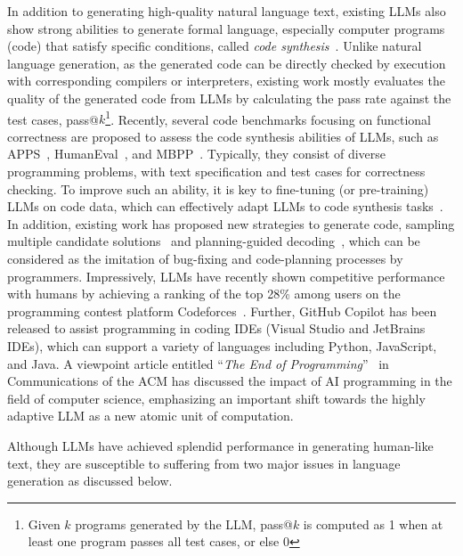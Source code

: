 In addition to generating high-quality natural language text, existing LLMs also show strong abilities to generate {formal language, especially  computer programs (\ie code)} that satisfy specific conditions, called \emph{code synthesis}~\cite{Gulwani-Found-2017-Program}. 
Unlike natural language generation, as the generated code can be directly checked by execution with corresponding compilers or interpreters, existing work mostly evaluates the quality of the generated code from LLMs by calculating the pass rate against the test cases, \ie pass@$k$\footnote{Given $k$ programs generated by the LLM, pass@$k$ is computed as 1 when at least one program passes all test cases, or else 0}. %
Recently, several code benchmarks focusing on functional correctness are proposed to assess the code synthesis abilities of LLMs, such as APPS~\cite{Hendrycks-nips-2021-Measuring}, HumanEval~\cite{Chen-arxiv-2021-evaluating}, and MBPP~\cite{Austin-arxiv-2021-Program}. 
Typically, they consist of diverse programming problems, with text specification and test cases for correctness checking. 
To improve such an ability, it is key to fine-tuning (or pre-training) LLMs on code data, which can effectively adapt LLMs to code synthesis tasks~\cite{nijkamp-arxiv-2022-Codegen}.
{In addition, existing work  has proposed new strategies to generate code, \eg sampling multiple candidate solutions~\cite{Austin-arxiv-2021-Program} and planning-guided decoding~\cite{Zhang-ICLR-2023-Planning}, which can be considered as the imitation of bug-fixing and code-planning processes by  programmers.}
Impressively,  LLMs have recently shown competitive performance with humans by achieving a ranking of the top 28\% among users on the programming contest platform Codeforces~\cite{Li-Science-2022-AlphaCode}. 
Further, GitHub Copilot has been released to assist programming in coding IDEs (\eg Visual Studio and JetBrains IDEs), which can support  a variety of  languages including Python, JavaScript, and Java. 
A viewpoint article entitled ``\emph{The End of Programming}''~\cite{Welsh-ACM-2023-The} in Communications of the ACM  has discussed the impact of AI programming in the field of computer science, emphasizing an important shift towards the highly adaptive LLM as a new atomic  unit of computation. 

 Although LLMs have achieved splendid performance in generating human-like text, they are susceptible to suffering from two major issues in language generation as discussed below.

